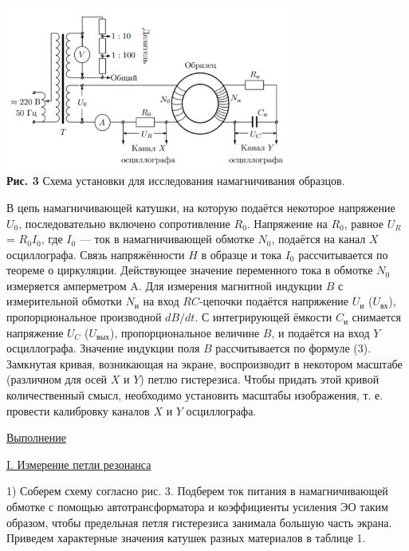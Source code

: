 \documentclass{article}
\begin{document}
\begin{center}
	\includegraphics[width=0.7\textwidth]{scheme.png} \\
	\textbf{Рис. 3} Схема установки для исследования намагничивания образцов.
\end{center}

В цепь намагничивающей катушки, на которую подаётся некоторое
напряжение $U_0$, последовательно включено сопротивление $R_0$. Напряжение на $R_0$, равное $U_R$= $R_0I_0$, где $I_0$ — ток в намагничивающей обмотке $N_0$, подаётся на канал $ X $ осциллографа. Связь напряжённости $ H $ в образце и тока $I_0$ рассчитывается по теореме о циркуляции.  Действующее значение переменного тока в обмотке $N_0$ измеряется амперметром A. Для измерения магнитной индукции $ B $ с измерительной обмотки $N_\text{и}$ на вход $ RC $-цепочки подаётся напряжение $U_\text{и}$ ($U_{\text{вх}}$), пропорциональное производной $ dB/dt $. С интегрирующей ёмкости $C_\text{и}$ снимается напряжение $U_C$ ($U_{\text{вых}}$), пропорциональное величине $ B $, и подаётся на вход $ Y $ осциллографа. Значение индукции поля $ B $ рассчитывается по формуле (3). Замкнутая кривая, возникающая на экране, воспроизводит в некотором масштабе (различном для осей $ X $ и $ Y $) петлю гистерезиса. Чтобы придать этой кривой количественный смысл, необходимо установить масштабы изображения, т. е. провести калибровку каналов $ X $ и $ Y $ осциллографа.

\begin{center}
    \raggedleft
        \underline{\underline{\LARGE {Выполнение}}}
\end{center}

\begin{center}
    \underline{\large {\RN{1}. Измерение петли резонанса}}
\end{center}

1) Соберем схему согласно рис. 3. Подберем ток питания в намагничивающей обмотке с помощью автотрансформатора и коэффициенты усиления ЭО таким образом, чтобы предельная петля гистерезиса занимала большую часть экрана. Приведем характерные значения катушек разных материалов в таблице 1.
\end{document}
